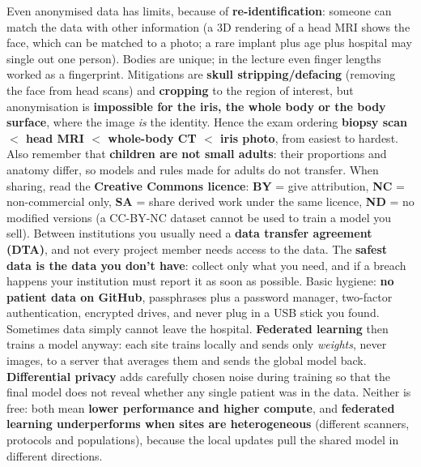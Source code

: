 \documentclass[a4paper]{article}
\newcommand{\K}[1]{\textcolor{kg}{\textbf{#1}}}
\newcommand{\E}[1]{\textcolor{ep}{#1}}
\newcommand{\T}[1]{\textcolor{tr}{\textbf{#1}}}
\begin{document}
Even anonymised data has limits, because of \K{re-identification}: someone can match the data with other information (\E{a 3D rendering of a head MRI shows the face, which can be matched to a photo; a rare implant plus age plus hospital may single out one person}). Bodies are unique; in the lecture even finger lengths worked as a fingerprint. Mitigations are \K{skull stripping/defacing} (removing the face from head scans) and \K{cropping} to the region of interest, but anonymisation is \T{impossible for the iris, the whole body or the body surface}, where the image \emph{is} the identity. Hence the exam ordering \T{biopsy scan $<$ head MRI $<$ whole-body CT $<$ iris photo}, from easiest to hardest. Also remember that \T{children are not small adults}: their proportions and anatomy differ, so models and rules made for adults do not transfer. When sharing, read the \K{Creative Commons licence}: \K{BY} = give attribution, \K{NC} = non-commercial only, \K{SA} = share derived work under the same licence, \K{ND} = no modified versions (\E{a CC-BY-NC dataset cannot be used to train a model you sell}). Between institutions you usually need a \K{data transfer agreement (DTA)}, and not every project member needs access to the data. The \K{safest data is the data you don't have}: collect only what you need, and if a breach happens your institution must report it as soon as possible. Basic hygiene: \T{no patient data on GitHub}, passphrases plus a password manager, two-factor authentication, encrypted drives, and never plug in a USB stick you found. Sometimes data simply cannot leave the hospital. \K{Federated learning} then trains a model anyway: each site trains locally and sends only \emph{weights}, never images, to a server that averages them and sends the global model back. \K{Differential privacy} adds carefully chosen noise during training so that the final model does not reveal whether any single patient was in the data. Neither is free: both mean \T{lower performance and higher compute}, and \T{federated learning underperforms when sites are heterogeneous} (different scanners, protocols and populations), because the local updates pull the shared model in different directions.
\end{document}
